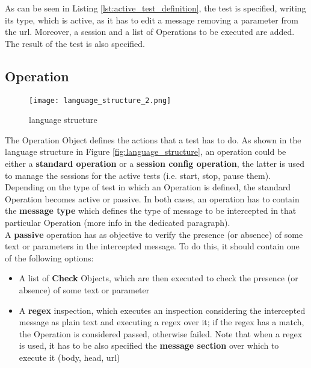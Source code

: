 As can be seen in Listing \ref{lst:active_test_definition}, the test is specified, writing its type, which is active, as it has to edit a message removing a parameter from the url. Moreover, a session and a list of Operations to be executed are added. The result of the test is also specified.

\subsection{Operation}
\label{sec:operation}
\begin{wrapfigure}{r}{0.4\textwidth}
    \texttt{[image: language\_structure\_2.png]}
    \caption{language structure}
    \label{fig:language_structure_2}
\end{wrapfigure}
The Operation Object defines the actions that a test has to do. As shown in the language structure in Figure \ref{fig:language_structure}, an operation could be either a \textbf{standard operation} or a \textbf{session config operation}, the latter is used to manage the sessions for the active tests (i.e. start, stop, pause them). Depending on the type of test in which an Operation is defined, the standard Operation becomes active or passive.
In both cases, an operation has to contain the \textbf{message type} which defines the type of message to be intercepted in that particular Operation (more info in the dedicated paragraph).
\\A \textbf{passive} operation has as objective to verify the presence (or absence) of some text or parameters in the intercepted message. To do this, it should contain one of the following options:
\begin{itemize}
    \item A list of \textbf{Check} Objects, which are then executed to check the presence (or absence) of some text or parameter
    \item A \textbf{regex} inspection, which executes an inspection considering the intercepted message as plain text and executing a regex over it; if the regex has a match, the Operation is considered passed, otherwise failed. Note that when a regex is used, it has to be also specified the \textbf{message section} over which to execute it (body, head, url)
\end{itemize}


